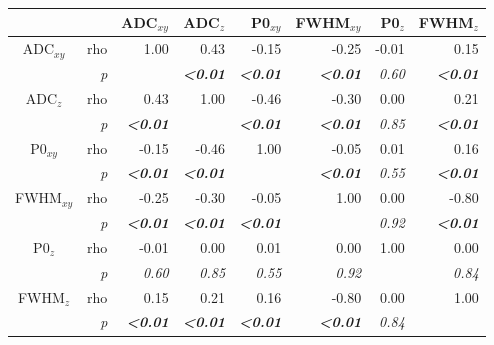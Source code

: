 \begin{table}
 \centering
    \begin{tabular}{rrrrrrrr}
    \addlinespace
    \toprule
              &       & ADC$_{xy}$  & ADC$_{z}$  & P0$_{xy}$   & FWHM$_{xy}$   & P0$_{z}$   & FWHM$_{z}$ \\
    \midrule
    \multicolumn{1}{c}{\multirow{2}[0]{*}{ADC$_{xy}$}} & rho   & 1.00  & 0.43  & -0.15 & -0.25 & -0.01 & 0.15 \\
    \multicolumn{1}{c}{} & \textit{p} & \textit{} & \textbf{\textit{<0.01}} & \textbf{\textit{<0.01}} & \textbf{\textit{<0.01}} & \textit{0.60} & \textbf{\textit{<0.01}} \\
    \multicolumn{1}{c}{\multirow{2}[0]{*}{ADC$_{z}$}} & rho   & 0.43  & 1.00  & -0.46 & -0.30 & 0.00  & 0.21 \\
    \multicolumn{1}{c}{} & \textit{p} & \textbf{\textit{<0.01}} & \textit{} & \textbf{\textit{<0.01}} & \textbf{\textit{<0.01}} & \textit{0.85} & \textbf{\textit{<0.01}} \\
    \multicolumn{1}{c}{\multirow{2}[0]{*}{P0$_{xy}$}} & rho   & -0.15 & -0.46 & 1.00  & -0.05 & 0.01  & 0.16 \\
    \multicolumn{1}{c}{} & \textit{p} & \textbf{\textit{<0.01}} & \textbf{\textit{<0.01}} & \textit{} & \textbf{\textit{<0.01}} & \textit{0.55} & \textbf{\textit{<0.01}} \\
    \multicolumn{1}{c}{\multirow{2}[0]{*}{FWHM$_{xy}$}} & rho   & -0.25 & -0.30 & -0.05 & 1.00  & 0.00  & -0.80 \\
    \multicolumn{1}{c}{} & \textit{p} & \textbf{\textit{<0.01}} & \textbf{\textit{<0.01}} & \textbf{\textit{<0.01}} & \textit{} & \textit{0.92} & \textbf{\textit{<0.01}} \\
    \multicolumn{1}{c}{\multirow{2}[0]{*}{P0$_{z}$}} & rho   & -0.01 & 0.00  & 0.01  & 0.00  & 1.00  & 0.00 \\
    \multicolumn{1}{c}{} & \textit{p} & \textit{0.60} & \textit{0.85} & \textit{0.55} & \textit{0.92} & \textit{} & \textit{0.84} \\
    \multicolumn{1}{c}{\multirow{2}[0]{*}{FWHM$_{z}$}} & rho   & 0.15  & 0.21  & 0.16  & -0.80 & 0.00  & 1.00 \\
    \multicolumn{1}{c}{} & \textit{p} & \textbf{\textit{<0.01}} & \textbf{\textit{<0.01}} & \textbf{\textit{<0.01}} & \textbf{\textit{<0.01}} & \textit{0.84} & \textit{} \\
    \bottomrule
    \end{tabular}%
  \label{tab:chapter5 exp2 correlations}
\end{table}
